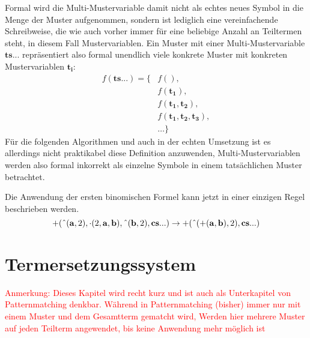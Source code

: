 \documentclass{scrartcl}
\numberwithin{figure}{section} %
\theoremstyle{definition} %
\begin{document}
Formal wird die Multi-Mustervariable damit nicht als echtes neues Symbol in die Menge der Muster aufgenommen, sondern ist lediglich eine vereinfachende Schreibweise, die wie auch vorher immer für eine beliebige Anzahl an Teiltermen steht, in diesem Fall Mustervariablen. Ein Muster mit einer Multi-Mustervariable $\mathbf{ts...}$ repräsentiert also formal unendlich viele konkrete Muster mit konkreten Mustervariablen $\mathbf{t_i}$:
\begin{equation*}
    \begin{split}
    		f(\mathbf{ts...}) = \{&f(), \\
    		&f(\mathbf{t_1}),\\
    		&f(\mathbf{t_1}, \mathbf{t_2}), \\
    		&f(\mathbf{t_1}, \mathbf{t_2}, \mathbf{t_3}), \\
    		&\dots \}    		
    \end{split}
\end{equation*}
Für die folgenden Algorithmen und auch in der echten Umsetzung ist es allerdings nicht praktikabel diese Definition anzuwenden, Multi-Mustervariablen werden also formal inkorrekt als einzelne Symbole in einem tatsächlichen Muster betrachtet.

Die Anwendung der ersten binomischen Formel kann jetzt in einer einzigen Regel beschrieben werden.
$$+(\string^(\mathbf a, 2), \cdot(2, \mathbf a, \mathbf b), \string^(\mathbf b, 2), \mathbf{cs...}) \rightarrow +(\string^(+(\mathbf a, \mathbf b), 2), \mathbf{cs...})$$


\section{Termersetzungssystem} \label{secTermersetzungssystem}
\textcolor{red} {
\begin{itshape}
Anmerkung: Dieses Kapitel wird recht kurz und ist auch als Unterkapitel von Patternmatching denkbar. 
Während in Patternmatching (bisher) immer nur mit einem Muster und dem Gesamtterm gematcht wird, Werden hier mehrere Muster auf jeden Teilterm angewendet, bis keine Anwendung mehr möglich ist
\end{itshape}
}

\end{document}
